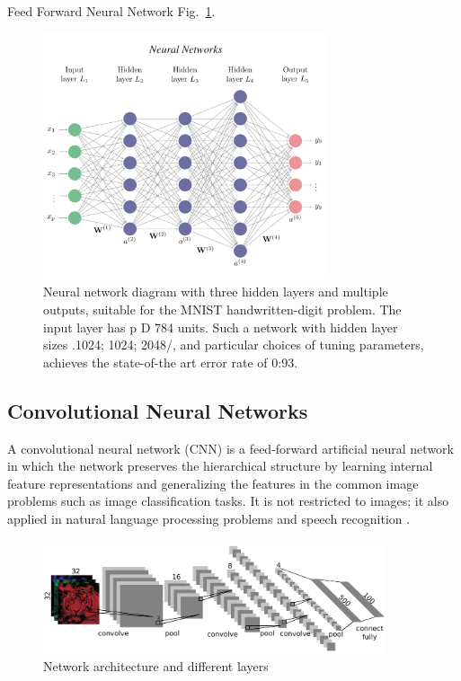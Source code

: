 Feed Forward Neural Network Fig.~\ref{fig:multi-layer}.
\begin{figure}[htbp]
\centering
\includegraphics[width=0.75\textwidth]{images/NN.png}
\caption{Neural network diagram with three hidden layers and multiple outputs, suitable for the MNIST handwritten-digit problem. The input layer has p D 784 units. Such a network with hidden layer sizes .1024; 1024; 2048/, and particular choices of tuning parameters, achieves the state-of-the art error rate of 0:93.}
\label{fig:multi-layer}
\end{figure}

\clearpage

\subsection{Convolutional Neural Networks}
A convolutional neural network (CNN) is a feed-forward artificial neural network in which the network preserves the hierarchical structure by learning internal feature representations and generalizing the features in the common image problems such as image classification tasks. It is not restricted to images; it also applied in natural language processing problems and speech recognition \cite{Manaswi2018}.

\begin{figure}[htbp]
\centering
\includegraphics[width=0.90\textwidth]{images/cnn-arch-1.png}
\caption{Network architecture and different layers}
\label{fig:CNN-1}
\end{figure}

